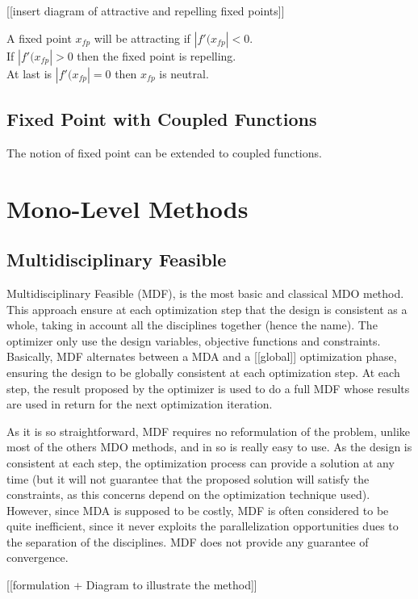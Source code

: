 [[insert diagram of attractive and repelling fixed points]]

A fixed point $x_{fp}$ will be attracting if $|f'(x_{fp}| < 0$.\\
If $|f'(x_{fp}| > 0$ then the fixed point is repelling.\\
At last is $|f'(x_{fp}| = 0$ then $x_{fp}$ is neutral.


\subsection{Fixed Point with Coupled Functions}

The notion of fixed point can be extended to coupled functions.


\section{Mono-Level Methods}

\subsection{Multidisciplinary Feasible}

Multidisciplinary Feasible (MDF), is the most basic and classical MDO method. This approach ensure at each optimization step that the design is consistent as a whole, taking in account all the disciplines together (hence the name). The optimizer only use the design variables, objective functions and constraints.
Basically, MDF alternates between a MDA and a [[global]] optimization phase, ensuring the design to be globally consistent at each optimization step. At each step, the result proposed by the optimizer is used to do a full MDF whose results are used in return for the next optimization iteration.

As it is so straightforward, MDF requires no reformulation of the problem, unlike most of the others MDO methods, and in so is really easy to use. As the design is consistent at each step, the optimization process can provide a solution at any time (but it will not guarantee that the proposed solution will satisfy the constraints, as this concerns depend on the optimization technique used). However, since MDA is supposed to be costly, MDF is often considered to be quite inefficient, since it never exploits the parallelization opportunities dues to the separation of the disciplines. MDF does not provide any guarantee of convergence.

[[formulation + Diagram to illustrate the method]]



